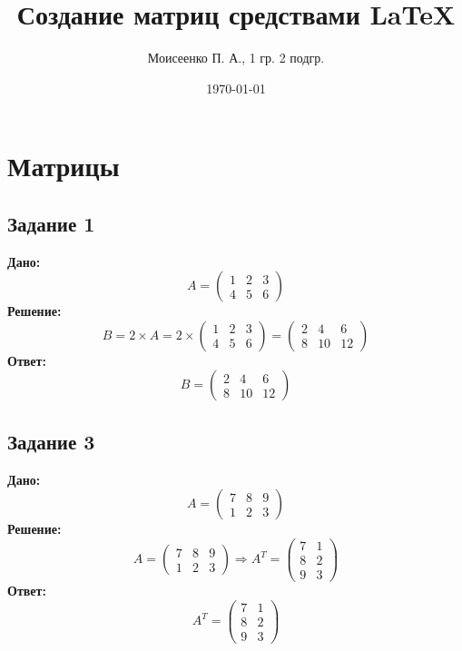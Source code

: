 \documentclass[a4paper,12pt]{article} %
\author{Моисеенко П. А., 1 гр. 2 подгр.} %
\title{Создание матриц средствами \LaTeX} %
\date{\today} %
\begin{document}
\maketitle
\newpage
\section{Матрицы}
\subsection{Задание 1}
\textbf{Дано:}
$$ A=\begin{pmatrix}
1& 2& 3 \\
4& 5& 6
\end{pmatrix} $$
\textbf{Решение:}
$$ B=2\times A=2\times \begin{pmatrix}
1& 2& 3 \\
4& 5& 6
\end{pmatrix}=
\begin{pmatrix}
2& 4& 6 \\
8& 10& 12
\end{pmatrix} $$
\textbf{Ответ:}
$$ B=\begin{pmatrix}
2& 4& 6 \\
8& 10& 12
\end{pmatrix} $$

\subsection{Задание 3}
\textbf{Дано:}
$$ A=\begin{pmatrix}
7& 8& 9 \\
1& 2& 3
\end{pmatrix} $$
\textbf{Решение:}
$$ A=\begin{pmatrix}
7& 8& 9 \\
1& 2& 3
\end{pmatrix} 
\Rightarrow A^T=
\begin{pmatrix}
7& 1 \\
8& 2 \\
9& 3
\end{pmatrix} $$
\textbf{Ответ:}
$$ A^T=\begin{pmatrix}
7& 1 \\
8& 2 \\
9& 3
\end{pmatrix} $$
\end{document}
